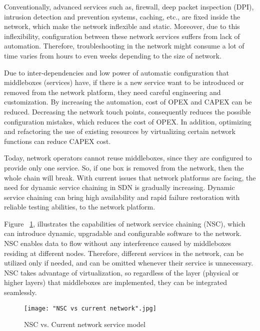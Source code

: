 \documentclass[english]{tktltiki2}
\theoremstyle{definition}
\theoremstyle{remark}
\begin{document}
Conventionally, advanced services such as, firewall, deep packet inspection (DPI), intrusion detection and prevention systems, caching, etc., are fixed inside the network, which make the network inflexible and static. Moreover, due to this inflexibility, configuration between these network services suffers from lack of automation. Therefore, troubleshooting in the network might consume a lot of time varies from hours to even weeks depending to the size of network. 

Due to inter-dependencies and low power of automatic configuration that middleboxes (services) have, if there is a new service want to be introduced or removed from the network platform, they need careful engineering and customization. By increasing the automation, cost of OPEX and CAPEX can be reduced.  Decreasing the network touch points, consequently reduces the possible configuration mistakes, which reduces the cost of OPEX. In addition, optimizing and refactoring the use of existing resources by virtualizing certain network functions can reduce CAPEX cost. 

Today, network operators cannot reuse middleboxes, since they are configured to provide only one service. So, if one box is removed from the network, then the whole chain will break. With current issues that network platforms are facing,  the need for dynamic service chaining in SDN is gradually increasing. Dynamic service chaining can bring high availability and rapid failure restoration with reliable testing abilities, to the network platform. 

Figure ~\ref{fig:NSC}, illustrates the capabilities of network service chaining (NSC), which can introduce dynamic, upgradable and configurable software to the network. NSC enables data to flow without any interference caused by middleboxes residing at different nodes. Therefore, different services in the network, can be utilized only if needed, and can be omitted whenever their service is unnecessary. NSC takes advantage of virtualization, so regardless of the layer (physical or higher layers) that middleboxes are implemented, they can be integrated seamlessly. 
       
\begin{figure}[h!]
\centering
{}
\texttt{[image: "NSC vs current network".jpg]}
\caption{NSC vs. Current network service model \cite{Wol13}}
\label{fig:NSC}
\end{figure}
\end{document}

